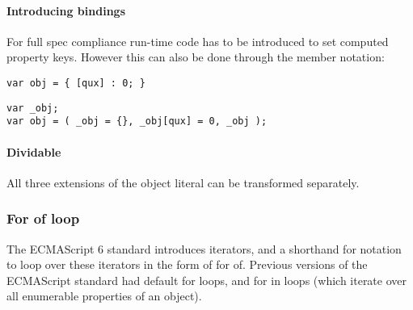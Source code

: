\paragraph{Introducing bindings}
For full spec compliance run-time code has to be introduced to set computed property keys. However this can also be done through the member notation:

\begin{lstlisting}
var obj = { [qux] : 0; }
\end{lstlisting}

\begin{lstlisting}
var _obj;
var obj = ( _obj = {}, _obj[qux] = 0, _obj );
\end{lstlisting}  

\paragraph{Dividable}
All three extensions of the object literal can be transformed separately. 

\subsubsection{For of loop}
The ECMAScript 6 standard introduces iterators, and a shorthand for notation to loop over these iterators in the form of for of\cite[13.6.4]{SpecJS}. Previous versions of the ECMAScript standard had default for loops, and for in loops (which iterate over all enumerable properties of an object).


